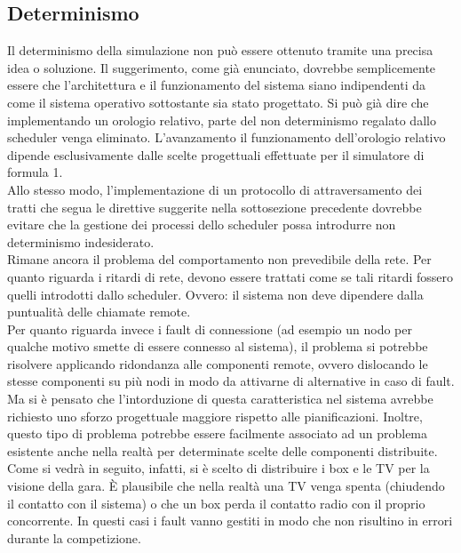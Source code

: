 \subsection{Determinismo} 
Il determinismo della simulazione non può essere ottenuto tramite una precisa
idea o soluzione. Il suggerimento, come già enunciato,
dovrebbe semplicemente essere che l'architettura e il funzionamento del sistema
siano indipendenti da come il sistema operativo
sottostante sia stato progettato. Si può già dire che implementando un orologio
relativo, parte del non determinismo regalato dallo scheduler
venga eliminato. L'avanzamento il funzionamento dell'orologio relativo dipende
esclusivamente dalle scelte progettuali effettuate per 
il simulatore di formula 1.\\
Allo stesso modo, l'implementazione di un protocollo di attraversamento dei
tratti che segua le direttive suggerite nella sottosezione precedente
dovrebbe evitare che la gestione dei processi dello scheduler possa introdurre
non determinismo indesiderato.\\
Rimane ancora il problema del comportamento non prevedibile della rete. Per
quanto riguarda i ritardi di rete, devono essere trattati come
se tali ritardi fossero quelli introdotti dallo scheduler. Ovvero: il sistema
non deve dipendere dalla puntualità delle chiamate remote.\\
Per quanto riguarda invece i fault di connessione (ad esempio un nodo per
qualche motivo smette di essere connesso al sistema), il problema 
si potrebbe risolvere applicando ridondanza alle componenti remote, ovvero
dislocando le stesse componenti su più nodi in modo da attivarne
di alternative in caso di fault. Ma si è pensato che l'intorduzione di questa
caratteristica nel sistema avrebbe richiesto uno sforzo progettuale
maggiore rispetto alle pianificazioni. Inoltre, questo tipo di problema potrebbe
essere facilmente associato ad un problema esistente anche nella
realtà per determinate scelte delle componenti distribuite. Come si vedrà in
seguito, infatti, si è scelto di distribuire i box e le TV per
la visione della gara. \`{E} plausibile che nella realtà una TV venga spenta
(chiudendo il contatto con il sistema) o che un box perda
il contatto radio con il proprio concorrente. In questi casi i fault vanno
gestiti in modo che non risultino in errori durante la competizione.
